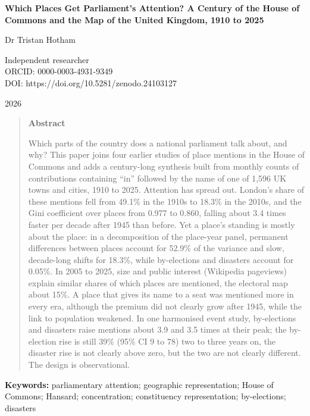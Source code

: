 \documentclass[11pt,a4paper]{article}
\begin{document}
\begin{center}
{\Large\bfseries Which Places Get Parliament's Attention? A Century of the House of Commons and the Map of the United Kingdom, 1910 to 2025\par}
\vspace{1.2em}
{\large Dr Tristan Hotham\par}
\vspace{0.3em}
{\small Independent researcher\\
ORCID: 0000-0003-4931-9349\\
DOI: https://doi.org/10.5281/zenodo.24103127\par}
\vspace{0.8em}
2026
\end{center}

\begin{quote}
\small
\begin{center}\textbf{Abstract}\end{center}
Which parts of the country does a national parliament talk about, and why? This paper joins four earlier studies of place mentions in the House of Commons and adds a century-long synthesis built from monthly counts of contributions containing ``in'' followed by the name of one of 1,596 UK towns and cities, 1910 to 2025. Attention has spread out. London's share of these mentions fell from 49.1\% in the 1910s to 18.3\% in the 2010s, and the Gini coefficient over places from 0.977 to 0.860, falling about 3.4 times faster per decade after 1945 than before. Yet a place's standing is mostly about the place: in a decomposition of the place-year panel, permanent differences between places account for 52.9\% of the variance and slow, decade-long shifts for 18.3\%, while by-elections and disasters account for 0.05\%. In 2005 to 2025, size and public interest (Wikipedia pageviews) explain similar shares of which places are mentioned, the electoral map about 15\%. A place that gives its name to a seat was mentioned more in every era, although the premium did not clearly grow after 1945, while the link to population weakened. In one harmonised event study, by-elections and disasters raise mentions about 3.9 and 3.5 times at their peak; the by-election rise is still 39\% (95\% CI 9 to 78) two to three years on, the disaster rise is not clearly above zero, but the two are not clearly different. The design is observational.
\end{quote}
\textbf{Keywords:} parliamentary attention; geographic representation; House of Commons; Hansard; concentration; constituency representation; by-elections; disasters
\end{document}
